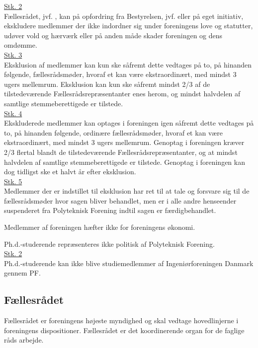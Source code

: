 \begin{list}
\underline{Stk. 2} \\
Fællesrådet, jvf. , kan på opfordring fra Bestyrelsen, jvf.  eller på eget initiativ, ekskludere medlemmer der ikke indordner sig under foreningens love og statutter, udøver vold og hærværk eller på anden måde skader foreningen og dens omdømme.\\

\underline{Stk. 3}\\
Eksklusion af medlemmer kan kun ske såfremt dette vedtages på to, på hinanden følgende, fællesrådsmøder, hvoraf et kan være ekstraordinært, med mindst 3 ugers mellemrum. Eksklusion kan kun ske såfremt mindst 2/3 af de tilstedeværende Fællesrådsrepræsentanter enes herom, og mindst halvdelen af
samtlige stemmeberettigede er tilstede.\\

\underline{Stk. 4}\\
Ekskluderede medlemmer kan optages i foreningen igen såfremt dette vedtages på to, på hinanden følgende, ordinære fællesrådsmøder, hvoraf et kan være ekstraordinært, med mindst 3 ugers mellemrum. Genoptag i foreningen kræver 2/3 flertal blandt de tilstedeværende Fællesrådsrepræsentanter, og at mindst halvdelen af samtlige stemmeberettigede er tilstede. Genoptag i foreningen kan dog tidligst ske et halvt år efter eksklusion.\\

\underline{Stk. 5}\\
Medlemmer der er indstillet til eksklusion har ret til at tale og forsvare sig til de fællesrådsmøder hvor sagen bliver behandlet, men er i alle andre henseender suspenderet fra Polyteknisk Forening indtil sagen er færdigbehandlet.
\item Medlemmer af foreningen hæfter ikke for foreningens økonomi.
\item \label{L:medlem:PHD} Ph.d.-studerende repræsenteres ikke politisk af Polyteknisk Forening.\\

\underline{Stk. 2}\\
Ph.d.-studerende kan ikke blive studiemedlemmer af Ingeniørforeningen Danmark gennem PF.


\subsection{Fællesrådet}
\label{L:kap:faellesraadet}
\item Fællesrådet er foreningens højeste myndighed og skal vedtage hovedlinjerne i foreningens dispositioner. Fællesrådet er det koordinerende organ for de faglige råds arbejde.


\end{list}
